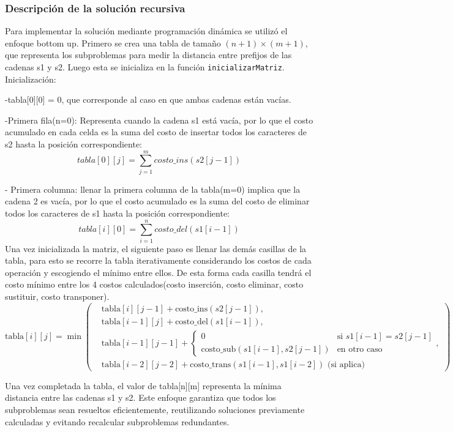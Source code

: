 \subsubsection{Descripción de la solución recursiva}
Para implementar la solución mediante programación dinámica se utilizó el enfoque bottom up. Primero se crea una tabla de tamaño $(n+1) \times (m+1)$, que representa los subproblemas para medir la distancia entre prefijos de las cadenas s1 y s2. Luego esta se inicializa en la función \texttt{inicializarMatriz}. Inicialización: 

-tabla[0][0] = 0, que corresponde al caso en que ambas cadenas están vacías.

-Primera fila(n=0): Representa cuando la cadena s1 está vacía, por lo que el costo acumulado en cada celda es la suma del costo de insertar todos los caracteres de s2 hasta la posición correspondiente:\\
\[tabla[0][j] = \sum_{j=1}^{m} costo\_ins(s2[j-1])\]

- Primera columna: llenar la primera columna de la tabla(m=0) implica que la cadena 2 es vacía, por lo que el costo acumulado es la suma del costo de eliminar todos los caracteres de s1 hasta la posición correspondiente:\\
\[tabla[i][0] = \sum_{i=1}^{n} costo\_del(s1[i-1])\]
Una vez inicializada la matriz, el siguiente paso es llenar las demás casillas de la tabla, para esto se recorre la tabla iterativamente considerando los costos de cada operación y escogiendo el mínimo entre ellos. De esta forma cada casilla tendrá el costo mínimo entre los 4 costos calculados(costo inserción, costo eliminar, costo sustituir, costo transponer).
\[
\text{tabla}[i][j] = \min\left(
\begin{aligned}
    &\text{tabla}[i][j-1] + \text{costo\_ins}(s2[j-1]), \\
    &\text{tabla}[i-1][j] + \text{costo\_del}(s1[i-1]), \\
    &\text{tabla}[i-1][j-1] + 
    \begin{cases} 
        0 & \text{si } s1[i-1] = s2[j-1] \\
        \text{costo\_sub}(s1[i-1], s2[j-1]) & \text{en otro caso}
    \end{cases}, \\
    &\text{tabla}[i-2][j-2] + \text{costo\_trans}(s1[i-1], s1[i-2]) \text{ (si aplica)}
\end{aligned}
\right)
\]

Una vez completada la tabla, el valor de tabla[n][m] representa la mínima distancia entre las cadenas s1 y s2. Este enfoque garantiza que todos los subproblemas sean resueltos eficientemente, reutilizando soluciones previamente calculadas y evitando recalcular subproblemas redundantes.
